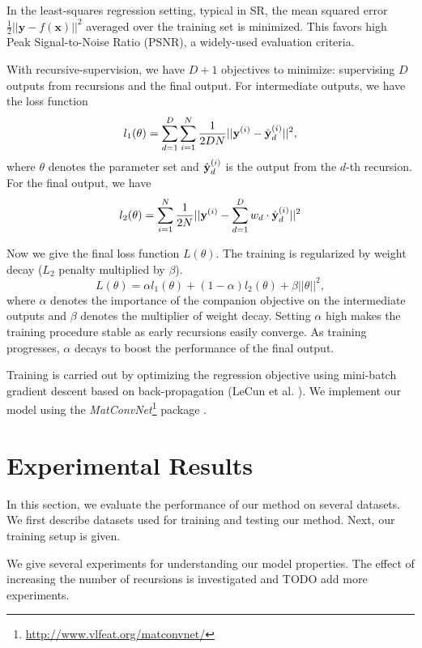 \documentclass[10pt,twocolumn,letterpaper]{article}
\begin{document}
In the least-squares regression setting, typical in SR, the mean squared error $\frac{1}{2}||\mathbf{y}-f(\mathbf{x})||^{2}$
averaged over the training set is minimized. This favors high Peak Signal-to-Noise
Ratio (PSNR), a widely-used evaluation criteria. 

With recursive-supervision, we have $D+1$ objectives to minimize: supervising $D$ outputs from recursions and the final output. For intermediate outputs, we have the loss function 
\begin{equation}
l_1(\theta) = \sum_{d=1}^D \sum_{i=1}^N \frac{1}{2DN}||{\bf y}^{(i)} -  \hat{\bf y}_d^{(i)} ||^{2},
\end{equation}
where $\theta$ denotes the parameter set and $\hat{\bf y}_d^{(i)}$ is the output from the $d$-th recursion. For the final output, we have 
\begin{equation}
l_2(\theta) = \sum_{i=1}^N \frac{1}{2N}||{\bf y}^{(i)} -  \sum_{d=1}^D  w_d \cdot \hat{\bf y}_d^{(i)} ||^{2}
\end{equation}

Now we give the final loss function $L(\theta)$. The training is regularized by weight decay ($L_2$ penalty multiplied by $\beta$). 
\begin{equation}
L(\theta)  =\alpha  l_1(\theta) + (1 - \alpha) l_2(\theta) + \beta ||\theta||^2,
\end{equation}
where $\alpha$ denotes the importance of the companion objective on the intermediate outputs and $\beta$ denotes the multiplier of weight decay.   Setting $\alpha$ high makes the training procedure stable as early recursions easily converge. As training progresses, $\alpha$ decays to boost the performance of the final output. 

Training is carried out by optimizing the regression objective using mini-batch gradient descent based on back-propagation (LeCun et al. \cite{lecun1998gradient}). We implement our model using the \textit{MatConvNet}\footnote{\url{ http://www.vlfeat.org/matconvnet/}} package \cite{arXiv:1412.4564}. 


\section{Experimental Results}
In this section, we evaluate the performance of our method on several datasets. We first describe datasets used for training and testing our method. Next, our training setup is given. 

We give several experiments for understanding our model properties. The effect of increasing the number of recursions is investigated and TODO add more experiments.  
\end{document}
